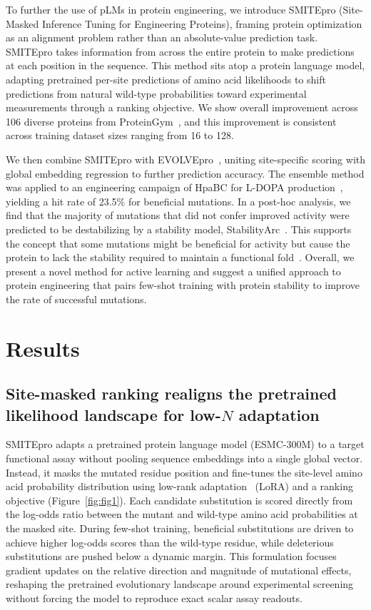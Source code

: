 \documentclass[sn-nature]{sn-jnl}
\begin{document}
To further the use of pLMs in protein engineering, we introduce SMITEpro (Site-Masked Inference Tuning for Engineering Proteins), framing protein optimization as an alignment problem rather than an absolute-value prediction task. SMITEpro takes information from across the entire protein to make predictions at each position in the sequence. This method sits atop a protein language model, adapting pretrained per-site predictions of amino acid likelihoods to shift predictions from natural wild-type probabilities toward experimental measurements through a ranking objective. We show overall improvement across 106 diverse proteins from ProteinGym~\cite{notin2023proteingym}, and this improvement is consistent across training dataset sizes ranging from 16 to 128. 

We then combine SMITEpro with EVOLVEpro~\cite{jiang2024rapid}, uniting site-specific scoring with global embedding regression to further prediction accuracy. The ensemble method was applied to an engineering campaign of HpaBC for L-DOPA production~\cite{gutierrez2026monooxygenase}, yielding a hit rate of 23.5\% for beneficial mutations. In a post-hoc analysis, we find that the majority of mutations that did not confer improved activity were predicted to be destabilizing by a stability model, StabilityArc~\cite{feller2026stabilityarc}. This supports the concept that some mutations might be beneficial for activity but cause the protein to lack the stability required to maintain a functional fold~\cite{tokuriki2009stability}. Overall, we present a novel method for active learning and suggest a unified approach to protein engineering that pairs few-shot training with protein stability to improve the rate of successful mutations.


\section{Results}
\subsection{Site-masked ranking realigns the pretrained likelihood landscape for low-$N$ adaptation}

SMITEpro adapts a pretrained protein language model (ESMC-300M) to a target functional assay without pooling sequence embeddings into a single global vector. Instead, it masks the mutated residue position and fine-tunes the site-level amino acid probability distribution using low-rank adaptation~\cite{hu2022lora} (LoRA) and a ranking objective (Figure~\ref{fig:fig1}). Each candidate substitution is scored directly from the log-odds ratio between the mutant and wild-type amino acid probabilities at the masked site. During few-shot training, beneficial substitutions are driven to achieve higher log-odds scores than the wild-type residue, while deleterious substitutions are pushed below a dynamic margin. This formulation focuses gradient updates on the relative direction and magnitude of mutational effects, reshaping the pretrained evolutionary landscape around experimental screening without forcing the model to reproduce exact scalar assay readouts.
\end{document}
